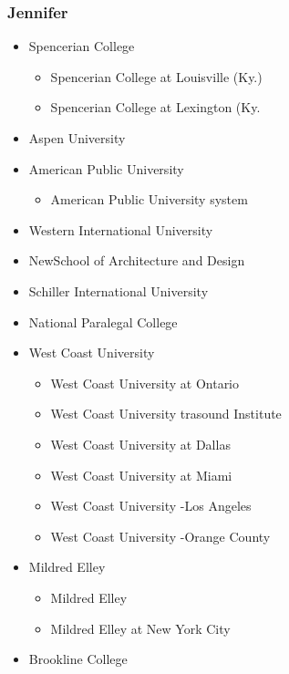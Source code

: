 \documentclass[
]{article}
\providecommand{\tightlist}{%
  \setlength{\itemsep}{0pt}\setlength{\parskip}{0pt}}
\begin{document}
\hypertarget{jennifer}{%
\subsubsection{Jennifer}\label{jennifer}}

\begin{itemize}
\tightlist
\item
  Spencerian College

  \begin{itemize}
  \tightlist
  \item
    Spencerian College at Louisville (Ky.)
  \item
    Spencerian College at Lexington (Ky.
  \end{itemize}
\item
  Aspen University\\
\item
  American Public University

  \begin{itemize}
  \tightlist
  \item
    American Public University system
  \end{itemize}
\item
  Western International University\\
\item
  NewSchool of Architecture and Design\\
\item
  Schiller International University
\item
  National Paralegal College\\
\item
  West Coast University

  \begin{itemize}
  \tightlist
  \item
    West Coast University at Ontario
  \item
    West Coast University trasound Institute
  \item
    West Coast University at Dallas
  \item
    West Coast University at Miami
  \item
    West Coast University -Los Angeles
  \item
    West Coast University -Orange County
  \end{itemize}
\item
  Mildred Elley

  \begin{itemize}
  \tightlist
  \item
    Mildred Elley
  \item
    Mildred Elley at New York City
  \end{itemize}
\item
  Brookline College


\end{itemize}
\end{document}
